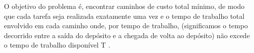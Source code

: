 O objetivo do problema é, encontrar caminhos de custo total mínimo, de modo que cada tarefa seja realizada exatamente uma vez e o tempo de trabalho total envolvido em cada caminho onde, por tempo de trabalho, (significamos o tempo decorrido entre a saída do depósito e a chegada de volta ao depósito) não excede o tempo de trabalho disponível T \cite{Beasley:1996}.






